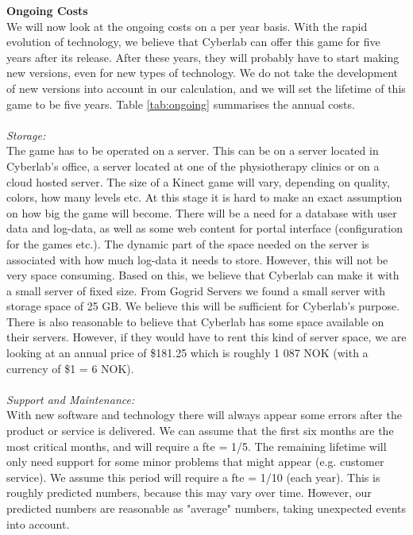\newpage
\textbf{Ongoing Costs}\\
We will now look at the ongoing costs on a per year basis. With the rapid evolution of technology, we believe that Cyberlab can offer this game for five years after its release. After these years, they will probably have to start making new versions, even for new types of technology. We do not take the development of new versions into account in our calculation, and we will set the lifetime of this game to be five years. Table \ref{tab:ongoing} summarises the annual costs. \\ \\
\emph{Storage:}\\
The game has to be operated on a server. This can be on a server located in Cyberlab’s office, a server located at one of the physiotherapy clinics or on a cloud hosted server. The size of a Kinect game will vary, depending on quality, colors, how many levels etc. At this stage it is hard to make an exact assumption on how big the game will become. There will be a need for a database with user data and log-data, as well as some web content for portal interface (configuration for the games etc.). The dynamic part of the space needed on the server is associated with how much log-data it needs to store. However, this will not be very space consuming. Based on this, we believe that Cyberlab can make it with a small server of fixed size. From Gogrid Servers \cite{priceserver} we found a small server with storage space of 25 GB. We believe this will be sufficient for Cyberlab's purpose. There is also reasonable to believe that Cyberlab has some space available on their servers. However, if they would have to rent this kind of server space, we are looking at an annual price of \$181.25 which is roughly 1 087 NOK (with a currency of \$1 = 6 NOK).\\ \\
\emph{Support and Maintenance:}\\
With new software and technology there will always appear some errors after the product or service is delivered. We can assume that the first six months are the most critical months, and will require a \ac{fte} = 1/5. The remaining lifetime will only need support for some minor problems that might appear (e.g. customer service). We assume this period will require a \ac{fte} = 1/10 (each year). This is roughly predicted numbers, because this may vary over time. However, our predicted numbers are reasonable as "average" numbers, taking unexpected events into account.  \\ \\
